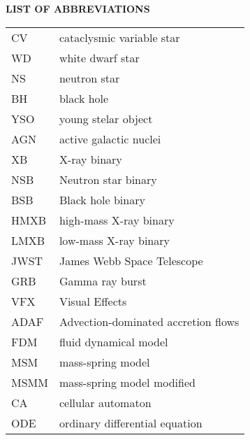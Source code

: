 \newpage
{}
{}
\noindent \Large \textbf{LIST OF ABBREVIATIONS}
\normalsize

\vspace{1cm}

\begin{center}
\def\arraystretch{1.5}%
\setlength\tabcolsep{1cm}
\begin{tabular}{ll}
    CV			& cataclysmic variable star \\
    WD			& white dwarf star \\
    NS          & neutron star \\
    BH          & black hole \\
    YSO         & young stelar object \\
    AGN         & active galactic nuclei \\
    XB          & X-ray binary \\
    NSB         & Neutron star binary \\
    BSB         & Black hole binary \\
    HMXB        & high-mass X-ray binary \\
    LMXB        & low-mass X-ray binary \\
    JWST        & James Webb Space Telescope \\
    GRB         & Gamma ray burst \\
    VFX         & Visual Effects \\
    ADAF        & Advection-dominated accretion flows \\
    FDM			& fluid dynamical model \\
    MSM			& mass-spring model \\
    MSMM		& mass-spring model modified \\
    CA			& cellular automaton \\
    ODE			& ordinary differential equation
\end{tabular}
\end{center}
